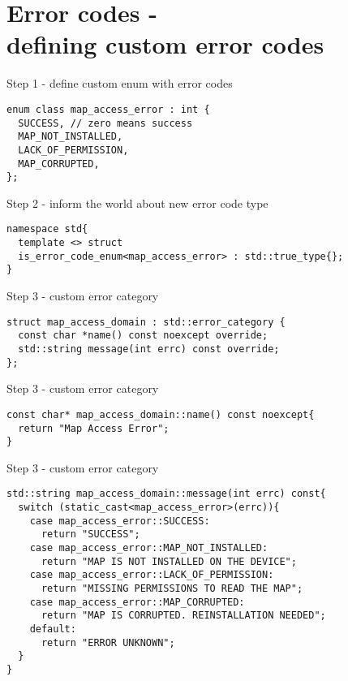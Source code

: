 \documentclass[10pt]{beamer}
\begin{document}
\section{Error codes - \\ defining custom error codes}

\begin{frame}[fragile]{Step 1 - define custom enum with error codes}
	\begin{verbatim}
enum class map_access_error : int {
  SUCCESS, // zero means success
  MAP_NOT_INSTALLED,
  LACK_OF_PERMISSION,
  MAP_CORRUPTED,
};
	\end{verbatim}
\end{frame}

\begin{frame}[fragile]{Step 2 - inform the world about new error code type}
\begin{verbatim}
namespace std{
  template <> struct
  is_error_code_enum<map_access_error> : std::true_type{};
}
\end{verbatim}
	
\end{frame}

\begin{frame}[fragile]{Step 3 - custom error category}
	
	\begin{verbatim}
struct map_access_domain : std::error_category {
  const char *name() const noexcept override;		
  std::string message(int errc) const override;
};
	\end{verbatim}
\end{frame}

\begin{frame}[fragile]{Step 3 - custom error category}
\begin{verbatim}
const char* map_access_domain::name() const noexcept{
  return "Map Access Error";
}
\end{verbatim}
\end{frame}

\begin{frame}[fragile]{Step 3 - custom error category}
	\begin{verbatim}
std::string map_access_domain::message(int errc) const{
  switch (static_cast<map_access_error>(errc)){
    case map_access_error::SUCCESS:
      return "SUCCESS";
    case map_access_error::MAP_NOT_INSTALLED:
      return "MAP IS NOT INSTALLED ON THE DEVICE";
    case map_access_error::LACK_OF_PERMISSION:
      return "MISSING PERMISSIONS TO READ THE MAP";
    case map_access_error::MAP_CORRUPTED:
      return "MAP IS CORRUPTED. REINSTALLATION NEEDED";
    default:
      return "ERROR UNKNOWN";
  }
}
	\end{verbatim}
\end{frame}
\end{document}

